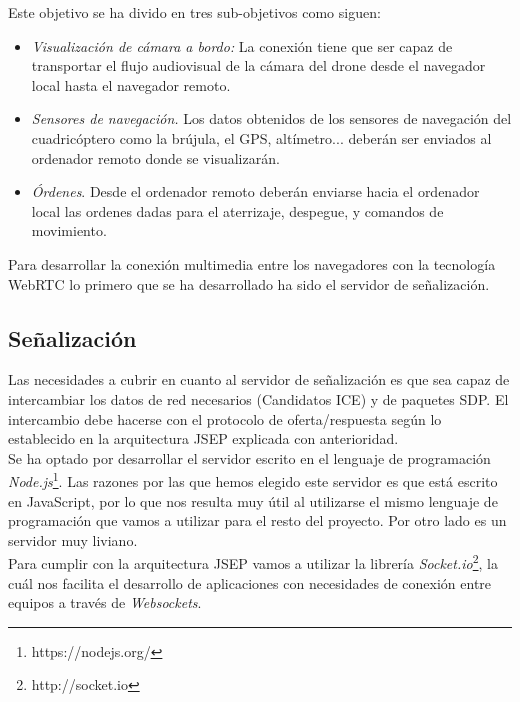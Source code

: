 Este objetivo se ha divido en tres sub-objetivos como siguen:
\begin{itemize}

\item \emph{Visualización de cámara a bordo:} La conexión tiene que ser capaz de transportar el flujo audiovisual de la cámara del drone desde el navegador local hasta el navegador remoto.

\item \emph{Sensores de navegación.} Los datos obtenidos de los sensores de navegación del cuadricóptero como la brújula, el GPS, altímetro... deberán ser enviados al ordenador remoto donde se visualizarán.

\item \emph{Órdenes}. Desde el ordenador remoto deberán enviarse hacia el ordenador local las ordenes dadas para el aterrizaje, despegue, y comandos de movimiento.

\end{itemize}

Para desarrollar la conexión multimedia entre los navegadores con la tecnología WebRTC lo primero que se ha desarrollado ha sido el servidor de señalización.\\

\subsection{Señalización}

Las necesidades a cubrir en cuanto al servidor de señalización es que sea capaz de intercambiar los datos de red necesarios (Candidatos ICE) y de paquetes SDP. El intercambio debe hacerse con el protocolo de oferta/respuesta según lo establecido en la arquitectura JSEP explicada con anterioridad.\\

Se ha optado por desarrollar el servidor escrito en el lenguaje de programación \emph{Node.js}\footnote{https://nodejs.org/}. Las razones por las que hemos elegido este servidor es que está escrito en JavaScript, por lo que nos resulta muy útil al utilizarse el mismo lenguaje de programación que vamos a utilizar para el resto del proyecto. Por otro lado es un servidor muy liviano.\\

Para cumplir con la arquitectura JSEP vamos a utilizar la librería \emph{Socket.io}\footnote{http://socket.io}, la cuál nos facilita el desarrollo de aplicaciones con necesidades de conexión entre equipos a través de \emph{Websockets}.\\

